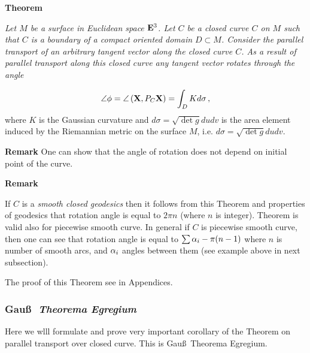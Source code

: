 \documentclass[12pt]{article}
\theoremstyle{theorem}
\numberwithin{equation}{section}
\begin{document}
{{\m

{\bf Theorem}
{\it  Let $M$ be a surface in  Euclidean space ${\bf E}^3$.
  Let $C$ be a closed curve $C$ on $M$ such that $C$ 
is a boundary of a compact oriented domain $D\subset M$.
Consider the parallel transport of an arbitrary tangent vector 
along the closed curve $C$.
As a result of parallel transport along this closed curve 
any  tangent vector rotates through the angle

\begin{equation}\label{theoremofrotationonangle}
\angle\phi=\angle\left({{\bf X}, P_C{\bf X}}\right)=\int_D K d\sigma\,,
             \end{equation}
where $K$ is the Gaussian curvature and $d\sigma=\sqrt {\det g}dudv$ is the area element induced by the
Riemannian metric on the surface $M$, i.e.  $d\sigma=\sqrt {\det g}dudv$.



}

\m
{\bf Remark} One can show that the angle of rotation does not depend on initial point of the curve.


\m

{\footnotesize
{\bf Remark} 

  If $C$ is a {\it smooth closed geodesics} 
then it follows from this 
Theorem and properties of geodesics that rotation angle is
equal to $2\pi n$ (where $n$ is integer). 
Theorem is valid also for piecewise smooth curve. 
In general if $C$
is piecewise smooth curve, then one can see  that
  rotation angle is equal to $\sum \alpha_i- \pi (n-1)$
where $n$ is number of smooth arcs, and $\alpha_i$
angles between them (see example above in next subsection). 


}


The proof of this Theorem see in Appendices.


\subsubsection {Gau\ss\,\, {\it Theorema Egregium}}


  Here we wlll formulate and prove very important
corollary of the Theorem on parallel transport
over closed curve. This is Gau\ss\, Theorema   Egregium.

}}
\end{document}
